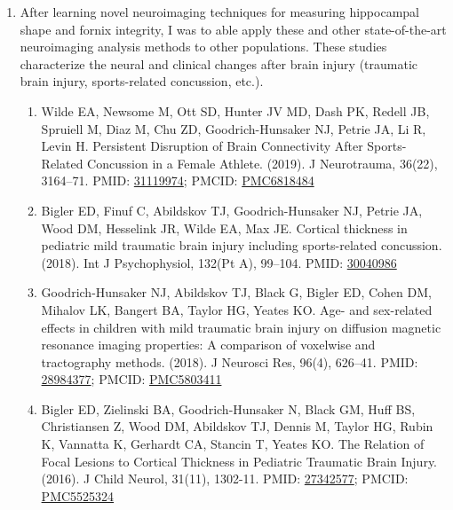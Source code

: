 \documentclass{nihbiosketch}
\begin{document}
\begin{enumerate}
\begin{enumerate}
	      \end{enumerate}   

    \item After learning novel neuroimaging techniques for measuring hippocampal shape and fornix integrity, I was to able apply these and other state-of-the-art neuroimaging analysis methods to other populations. These studies characterize the neural and clinical changes after brain injury (traumatic brain injury, sports-related concussion, etc.).
	      
	      \begin{enumerate}   
	      	
	      	\item Wilde EA, Newsome M, Ott SD, Hunter JV MD, Dash PK, Redell JB, Spruiell M, Diaz M, Chu ZD, Goodrich-Hunsaker NJ, Petrie JA, Li R, Levin H. Persistent Disruption of Brain Connectivity After Sports-Related Concussion in a Female Athlete. (2019). J Neurotrauma,  36(22), 3164--71. PMID: \href{https:/pubmed.gov/31119974}{31119974}; PMCID: \href{https://www.ncbi.nlm.nih.gov/pmc/articles/PMC6818484}{PMC6818484 }
	      	      
	      	\item Bigler ED, Finuf C, Abildskov TJ, Goodrich-Hunsaker NJ, Petrie JA, Wood DM, Hesselink JR, Wilde EA, Max JE. Cortical thickness in pediatric mild traumatic brain injury including sports-related concussion. (2018). Int J Psychophysiol, 132(Pt A), 99--104. PMID: \href{https:/pubmed.gov/30040986}{30040986}
	      	      
	      	\item  Goodrich-Hunsaker NJ, Abildskov TJ, Black G, Bigler ED, Cohen DM, Mihalov LK, Bangert BA, Taylor HG, Yeates KO. Age- and sex-related effects in children with mild traumatic brain injury on diffusion magnetic resonance imaging properties: A comparison of voxelwise and tractography methods. (2018). J Neurosci Res, 96(4), 626--41. PMID: \href{https:/pubmed.gov/28984377}{28984377}; PMCID: \href{https://www.ncbi.nlm.nih.gov/pmc/articles/PMC5803411}{PMC5803411}
	      	
	      	\item Bigler ED, Zielinski BA, Goodrich-Hunsaker N, Black GM, Huff BS, Christiansen Z, Wood DM, Abildskov TJ, Dennis M, Taylor HG, Rubin K, Vannatta K, Gerhardt CA, Stancin T, Yeates KO. The Relation of Focal Lesions to Cortical Thickness in Pediatric Traumatic Brain Injury. (2016). J Child Neurol, 31(11), 1302-11. PMID: \href{https:/pubmed.gov/27342577}{27342577}; PMCID: \href{https://www.ncbi.nlm.nih.gov/pmc/articles/PMC5525324}{PMC5525324}
	      	      
	      \end{enumerate} 
\end{enumerate}
\end{document}
